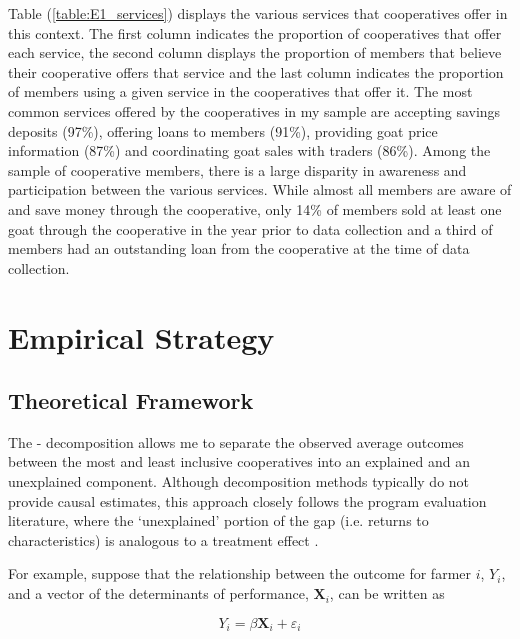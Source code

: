 \documentclass[11pt]{article}
\begin{document}
Table (\ref{table:E1_services}) displays the various services that cooperatives offer in this context. The first column indicates the proportion of cooperatives that offer each service, the second column displays the proportion of members that believe their cooperative offers that service and the last column indicates the proportion of members using a given service in the cooperatives that offer it. The most common services offered by the cooperatives in my sample are accepting savings deposits (97\%), offering loans to members (91\%), providing goat price information (87\%) and coordinating goat sales with traders (86\%). Among the sample of cooperative members, there is a large disparity in awareness and participation between the various services. While almost all members are aware of and save money through the cooperative, only 14\% of members sold at least one goat through the cooperative in the year prior to data collection and a third of members had an outstanding loan from the cooperative at the time of data collection.


\section{Empirical Strategy} \label{sec:E1_emp}

\subsection{Theoretical Framework} \label{sec:E1_theory}

The \citet{oaxaca_male-female_1973}-\citet{blinder_wage_1973} decomposition allows me to separate the observed average outcomes between the most and least inclusive cooperatives into an explained and an unexplained component. Although decomposition methods typically do not provide causal estimates, this approach closely follows the program evaluation literature, where the `unexplained' portion of the gap (i.e. returns to characteristics) is analogous to a treatment effect \citep{n_fortin_notitle_2011}.

For example, suppose that the relationship between the outcome for farmer $i$, $Y_i$, and a vector of the determinants of performance, $\mathbf{X}_i$, can be written as

\begin{equation} \label{eq:E1_1}
    Y_i = \beta \mathbf{X}_i + \varepsilon_i
\end{equation}  
\end{document}
